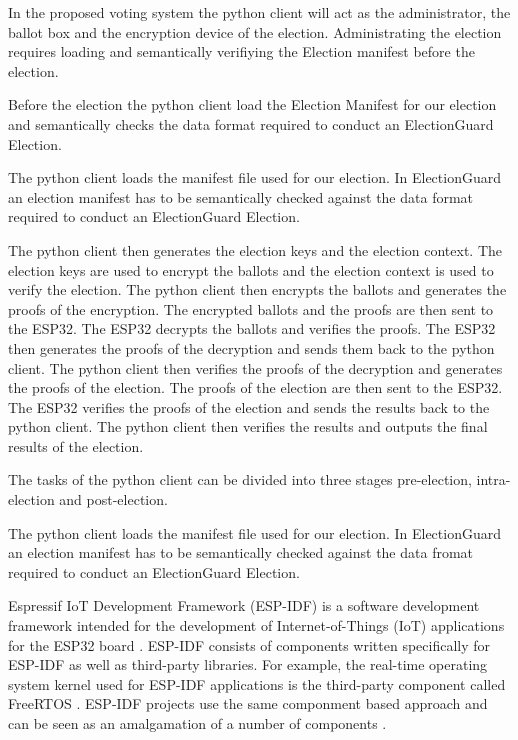 In the proposed voting system the python client will act as the administrator, the ballot box and the encryption device of the election. Administrating the election requires loading and semantically verifiying the Election manifest before the election.





Before the election the python client load the Election Manifest for our election and semantically checks the data format required to conduct an ElectionGuard Election. 




The python client loads the manifest file used for our election. In ElectionGuard an election manifest has to be semantically checked against the data format required to conduct an ElectionGuard Election. 


The python client then generates the election keys and the election context. The election keys are used to encrypt the ballots and the election context is used to verify the election. The python client then encrypts the ballots and generates the proofs of the encryption. The encrypted ballots and the proofs are then sent to the ESP32. The ESP32 decrypts the ballots and verifies the proofs. The ESP32 then generates the proofs of the decryption and sends them back to the python client. The python client then verifies the proofs of the decryption and generates the proofs of the election. The proofs of the election are then sent to the ESP32. The ESP32 verifies the proofs of the election and sends the results back to the python client. The python client then verifies the results and outputs the final results of the election.

The tasks of the python client can be divided into three stages pre-election, intra-election and post-election.







The python client loads the manifest file used for our election. In ElectionGuard an election manifest has to be semantically checked against the data fromat required to conduct an ElectionGuard Election.



Espressif IoT Development Framework (ESP-IDF) is a software development framework intended for the development of Internet-of-Things (IoT) applications for the ESP32 board \cite{esp-prog}. ESP-IDF consists of components written specifically for ESP-IDF as well as third-party libraries.\cite{esp-prog} For example, the real-time operating system kernel used for ESP-IDF applications is the third-party component called FreeRTOS \cite{esp-prog}. ESP-IDF projects use the same componment based approach and can be seen as an amalgamation of a number of components \cite{esp-prog}.

